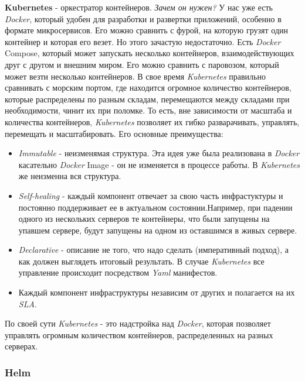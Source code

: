 \textbf{Kubernetes} - оркестратор контейнеров. \textit{Зачем он нужен?} У нас уже есть \textit{Docker}, который удобен для разработки и развертки приложений, особенно в формате микросервисов. Его можно сравнить с фурой, на которую грузят один контейнер и которая его везет. Но этого зачастую недостаточно. Есть \textit{Docker} Compose, который может запускать несколько контейнеров, взаимодействующих друг с другом и внешним миром. Его можно сравнить с паровозом, который может везти несколько контейнеров. В свое время \textit{Kubernetes} правильно сравнивать с морским портом, где находится огромное количество контейнеров, которые распределены по разным складам, перемещаются между складами при необходимости, чинит их при поломке. То есть, вне зависимости от масштаба и количества контейнеров, \textit{Kubernetes} позволяет их гибко разварачивать, управлять, перемещать и масштабировать.
Его основные преимущества:
\begin{itemize}
    \item \textit{Immutable} - неизменямая структура. Эта идея уже была реализована в \textit{Docker} касательно \textit{Docker} Image - он не изменяется в процессе работы. В \textit{Kubernetes} же неизменна вся структура.
    \item \textit{Self-healing} - каждый компонент отвечает за свою часть инфрастуктуры и постоянно поддерживает ее в актуальном состоянии.Например, при падении одного из нескольких серверов те контейнеры, что были запущены на упавшем сервере, будут запущены на одном из оставшимся в живых сервере.
    \item \textit{Declarative} - описание не того, что надо сделать (императивный подход), а как должен выглядеть итоговый результать. В случае \textit{Kubernetes} все управление происходит посредством \textit{Yaml} манифестов.
    \item Каждый компонент инфраструктуры независим от других и полагается на их \textit{SLA}.
\end{itemize}
По своей сути \textit{Kubernetes} - это надстройка над \textit{Docker}, которая позволяет управлять огромным количеством контейнеров, распределенных на разных серверах.

\subsubsection{Helm}

